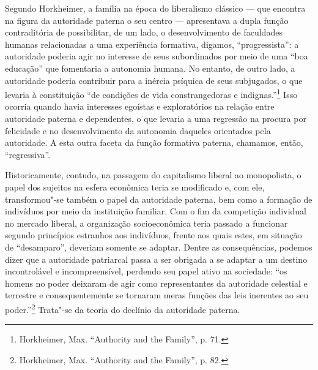 Segundo Horkheimer, a família na época do liberalismo clássico --- que
encontra na figura da autoridade paterna o seu centro --- apresentava a
dupla função contraditória de possibilitar, de um lado, o
desenvolvimento de faculdades humanas relacionadas a uma experiência
formativa, digamos, ``progressista'': a autoridade poderia agir no
interesse de seus subordinados por meio de uma ``boa educação'' que
fomentaria a autonomia humana. No entanto, de outro lado, a autoridade
poderia contribuir para a inércia psíquica de seus subjugados, o que
levaria à constituição ``de condições de vida constrangedoras e
indignas.''\footnote{Horkheimer, Max. ``Authority and the Family'', p.
  71.} Isso ocorria quando havia interesses egoístas e exploratórios na
relação entre autoridade paterna e dependentes, o que levaria a uma
regressão na procura por felicidade e no desenvolvimento da autonomia
daqueles orientados pela autoridade. A esta outra faceta da função
formativa paterna, chamamos, então, ``regressiva''.

Historicamente, contudo, na passagem do capitalismo liberal ao
monopolista, o papel dos sujeitos na esfera econômica teria se
modificado e, com ele, transformou"-se também o papel da autoridade
paterna, bem como a formação de indivíduos por meio da instituição
familiar. Com o fim da competição individual no mercado liberal, a
organização socioeconômica teria passado a funcionar segundo princípios
estranhos aos indivíduos, frente aos quais estes, em situação de
``desamparo'', deveriam somente se adaptar. Dentre as consequências,
podemos dizer que a autoridade patriarcal passa a ser obrigada a se
adaptar a um destino incontrolável e incompreensível, perdendo seu papel
ativo na sociedade: ``os homens no poder deixaram de agir como
representantes da autoridade celestial e terrestre e consequentemente se
tornaram meras funções das leis inerentes ao seu poder.''\footnote{Horkheimer,
  Max. ``Authority and the Family'', p. 82.} Trata"-se da teoria do
declínio da autoridade paterna.

